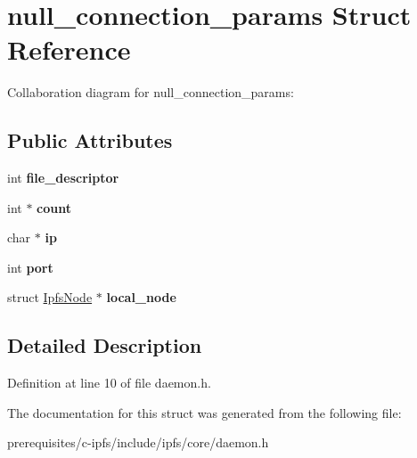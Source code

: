 \hypertarget{structnull__connection__params}{}\section{null\+\_\+connection\+\_\+params Struct Reference}
\label{structnull__connection__params}


Collaboration diagram for null\+\_\+connection\+\_\+params\+:
\subsection*{Public Attributes}
\begin{DoxyCompactItemize}
\item 
\mbox{\label{structnull__connection__params_a2223c95696b0c35fd688763bc1f17f13}} 
int {\bfseries file\+\_\+descriptor}
\item 
\mbox{\label{structnull__connection__params_a46bec9e2b605422990af7f60ccc9d421}} 
int $\ast$ {\bfseries count}
\item 
\mbox{\label{structnull__connection__params_aeb3d26119d315606bcebc661fb796f6b}} 
char $\ast$ {\bfseries ip}
\item 
\mbox{\label{structnull__connection__params_a9780839e707b0a93579f25a63782c8e9}} 
int {\bfseries port}
\item 
\mbox{\label{structnull__connection__params_aee79727437fa971e8b963182e29f520a}} 
struct \mbox{\hyperlink{struct_ipfs_node}{Ipfs\+Node}} $\ast$ {\bfseries local\+\_\+node}
\end{DoxyCompactItemize}


\subsection{Detailed Description}


Definition at line 10 of file daemon.\+h.



The documentation for this struct was generated from the following file\+:\begin{DoxyCompactItemize}
\item 
prerequisites/c-\/ipfs/include/ipfs/core/daemon.\+h\end{DoxyCompactItemize}
